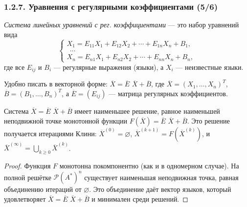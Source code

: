 \documentclass[mathserif,12pt,aspectratio=169]{beamer}
\renewcommand{\index}[1]{}
\def\odmkey#1#2{{\it\color{red} #1}\index{#2}}
\let\ge\geqslant
\begin{document}
\begin{frame}
\frametitle{1.2.7. Уравнения с регулярными коэффициентами (5/6)}
\odmkey{Система линейных уравнений с рег. коэффициентами}{Уравнение!система с регулярными коэффициентами}
--- это набор уравнений вида
\[
\begin{cases}
X_1 = E_{11}X_1 + E_{12}X_2 + \cdots + E_{1n}X_n + B_1,\\
\ \ \dots\\
X_n = E_{n1}X_1 + E_{n2}X_2 + \cdots + E_{nn}X_n + B_n,
\end{cases}
\]
где все $E_{ij}$ и $B_i$ --- регулярные выражения (языки), а $X_i$ --- неизвестные языки.

\begin{remark}
Удобно писать в векторной форме: $\overline{X}=\overline{E}$ $\overline{X}+\overline{B}$, где
$\overline{X}=(X_1,\dots,X_n)^T$, $\overline{B}=(B_1,\dots,B_n)^T$,
а $\overline{E}=(E_{ij})$ --- матрица регулярных коэффициентов.
\end{remark}

\begin{theorem}
Система $\overline{X}=\overline{E}$ $\overline{X}+\overline{B}$ имеет наименьшее решение,
равное наименьшей неподвижной точке монотонной функции $F(\overline{X})=\overline{E}$ $\overline{X}+\overline{B}$.
Это решение получается итерациями Клини:
$\overline{X}^{(0)}=\varnothing$, $\overline{X}^{(k+1)}=F(\overline{X}^{(k)})$, и
$\overline{X}^{(\infty)}=\bigcup_{k\ge 0}\overline{X}^{(k)}$.
\end{theorem}

\begin{proof}
Функция $F$ монотонна покомпонентно (как и в одномерном случае).
На полной решётке $\mathcal{P}(A^*)^n$ существует наименьшая неподвижная точка,
равная объединению итераций от $\varnothing$.
Это объединение даёт вектор языков, который удовлетворяет $\overline{X}=\overline{E}$ $\overline{X}+\overline{B}$ и минимален среди решений.
\end{proof}
\end{frame}
\end{document}
